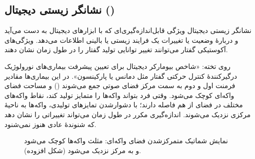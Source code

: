 \subsection{نشانگر زیستی دیجیتال ()}
\begin{definitionbox}{نشانگر زیستی دیجیتال}
ویژگی قابل‌اندازه‌گیری‌ای که با ابزارهای دیجیتال به دست می‌آید و دربارهٔ وضعیت یا تغییرات یک فرایند زیستی یا بالینی اطلاعات می‌دهد. ویژگی‌های آکوستیکی گفتار می‌توانند تغییر توانایی تولید گفتار را در طول زمان نشان دهند.
\end{definitionbox}

روی تخته: «شاخص بیومارکر دیجیتال برای تعیین پیشرفت بیماری‌های نورولوژیک درگیرکنندهٔ کنترل حرکتی گفتار مثل دمانس یا پارکینسون». در این بیماری‌ها مقادیر فرمنت اول و دوم به سمت مرکز فضای صوتی جمع می‌شوند () و مساحت فضای واکه‌ای کوچک می‌شود. وقتی فرد بتواند واکه‌ها را متمایز تولید کند، نقاط واکه‌های مختلف در فضای  از هم فاصله دارند؛ با دشوارشدن تمایزهای تولیدی، واکه‌ها به ناحیهٔ مرکزی نزدیک می‌شوند. اندازه‌گیری مکرر در طول زمان می‌تواند تغییراتی را نشان دهد که شنوندهٔ عادی هنوز نمی‌شنود.

\begin{figure}[htbp]
\centering
{}
\caption{نمایش شماتیک متمرکزشدن فضای واکه‌ای: مثلث واکه‌ها کوچک می‌شود و به مرکز نزدیک می‌شود (شکل افزوده).}
\end{figure}

